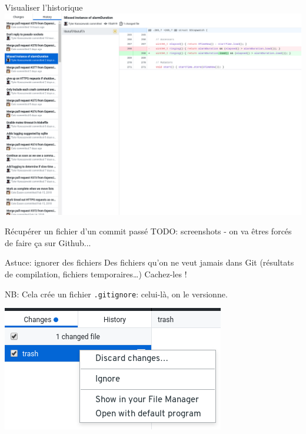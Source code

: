 \documentclass{beamer}
\begin{document}
\begin{frame}{Visualiser l'historique}
	 	   \includegraphics[scale=0.22]{img/github_desktop/historique.png}
\end{frame}

\begin{frame}{Récupérer un fichier d'un commit passé}
    TODO: screenshots - on va êtres forcés de faire ça sur Github...
\end{frame}

\begin{frame}{Astuce: ignorer des fichiers}
    Des fichiers qu'on ne veut jamais dans Git (résultats de compilation,
    fichiers temporaires\dots) Cachez-les !

    NB: Cela crée un fichier \texttt{.gitignore}: celui-là, on le versionne.
	\begin{center}
	 	   \includegraphics[scale=0.35]{img/github_desktop/ignore.png}
	\end{center}
\end{frame}
\end{document}

